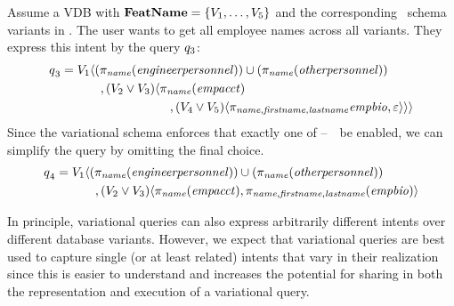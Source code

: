 \begin{example}
\label{eg:vq-same-intent-mult-vars}
Assume a VDB with  \ensuremath{\fSet = \setDef{\vOne, \ldots, \vFive}}
and the corresponding \basic\ schema
variants in . The user wants to get all employee names across all
variants. They express this intent by the query $\vQ_3$:
%
\begin{align*}
\vQ_3 &= 
  \vOne\chcL
    (\pi_{\name}(\engemp)) \cup (\pi_{\name}(\othemp)) \\
 & \hspace{32pt},
    (\vTwo\vee\vThree)\chcL
      \pi_{\name}(\empacct) \\
 & \hspace{88pt},
      \chc[(\vFour\vee\vFive)]{\pi_{\name,\fname,\lname}\empbio, \emp}\chcR\chcR
\end{align*}
%
Since the variational schema enforces that exactly one of \vOne--\ \vFive\ be enabled, we
can simplify the query by omitting the final choice.
%
\begin{align*}
\vQ_4 &= 
  \vOne\chcL
    (\pi_{\name}(\engemp)) \cup (\pi_{\name}(\othemp)) \\
 & \hspace{32pt},
    \chc[(\vTwo\vee\vThree)]{
      \pi_{\name}(\empacct),
      \pi_{\name,\fname,\lname}(\empbio)}
\end{align*}
%
\end{example}

In principle, variational queries can also express arbitrarily different intents over
different database variants. However, we expect that variational queries are best used to
capture single (or at least related) intents that vary in their realization
since this is easier to understand and increases the potential for sharing in
both the representation and execution of a variational query.






